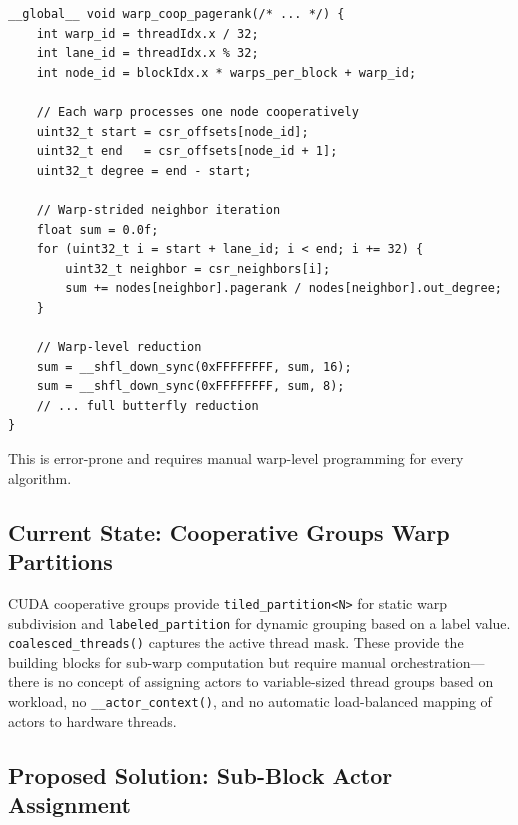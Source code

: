 \documentclass[11pt,a4paper]{article}
\begin{document}
\begin{lstlisting}[style=cstyle,title={Current: manual warp-cooperative processing}]
__global__ void warp_coop_pagerank(/* ... */) {
    int warp_id = threadIdx.x / 32;
    int lane_id = threadIdx.x % 32;
    int node_id = blockIdx.x * warps_per_block + warp_id;

    // Each warp processes one node cooperatively
    uint32_t start = csr_offsets[node_id];
    uint32_t end   = csr_offsets[node_id + 1];
    uint32_t degree = end - start;

    // Warp-strided neighbor iteration
    float sum = 0.0f;
    for (uint32_t i = start + lane_id; i < end; i += 32) {
        uint32_t neighbor = csr_neighbors[i];
        sum += nodes[neighbor].pagerank / nodes[neighbor].out_degree;
    }

    // Warp-level reduction
    sum = __shfl_down_sync(0xFFFFFFFF, sum, 16);
    sum = __shfl_down_sync(0xFFFFFFFF, sum, 8);
    // ... full butterfly reduction
}
\end{lstlisting}

This is error-prone and requires manual warp-level programming for every algorithm.

\subsection{Current State: Cooperative Groups Warp Partitions}

CUDA cooperative groups provide \texttt{tiled\_partition<N>} for static warp subdivision and \texttt{labeled\_partition} for dynamic grouping based on a label value. \texttt{coalesced\_threads()} captures the active thread mask. These provide the building blocks for sub-warp computation but require manual orchestration---there is no concept of assigning actors to variable-sized thread groups based on workload, no \texttt{\_\_actor\_context()}, and no automatic load-balanced mapping of actors to hardware threads.

\subsection{Proposed Solution: Sub-Block Actor Assignment}
\end{document}
